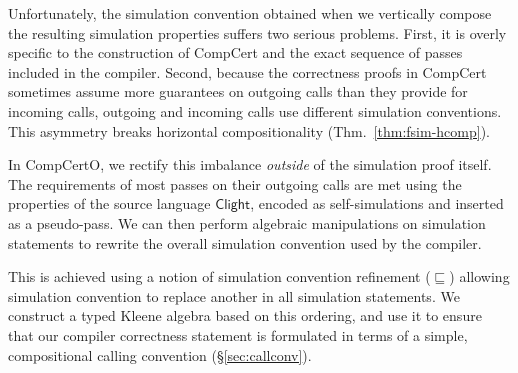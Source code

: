 \documentclass[sigplan,10pt,review]{acmart}
\newcommand{\kw}[1]{\ensuremath{ \mathsf{#1} }}
\newcommand{\screfd}{\sqsubseteq}
\begin{document}
Unfortunately,
the simulation convention obtained
when we vertically compose the resulting simulation properties
suffers two serious problems.
First,
it is overly specific to the construction of CompCert
and the exact sequence of passes included in the compiler.
Second,
because the correctness proofs in CompCert
sometimes assume more guarantees on outgoing calls
than they provide for incoming calls,
outgoing and incoming calls use different simulation conventions.
This asymmetry breaks %
horizontal compositionality (Thm.~\ref{thm:fsim-hcomp}).


In CompCertO,
we rectify this imbalance \emph{outside}
of the simulation proof itself.
The requirements of most passes
on their outgoing calls
are met using the properties
of the source language $\kw{Clight}$,
encoded as self-simulations
and inserted as a pseudo-pass.
We can then perform algebraic manipulations
on simulation statements
to rewrite the overall simulation convention
used by the compiler.

This is achieved using a notion of
simulation convention refinement ($\screfd$)
allowing simulation convention
to replace another in all simulation statements.
We construct a typed Kleene algebra \cite{tka}
based on this ordering,
and use it to ensure that
our compiler correctness statement
is formulated in terms of a simple,
compositional calling convention (\S\ref{sec:callconv}).

\end{document}
